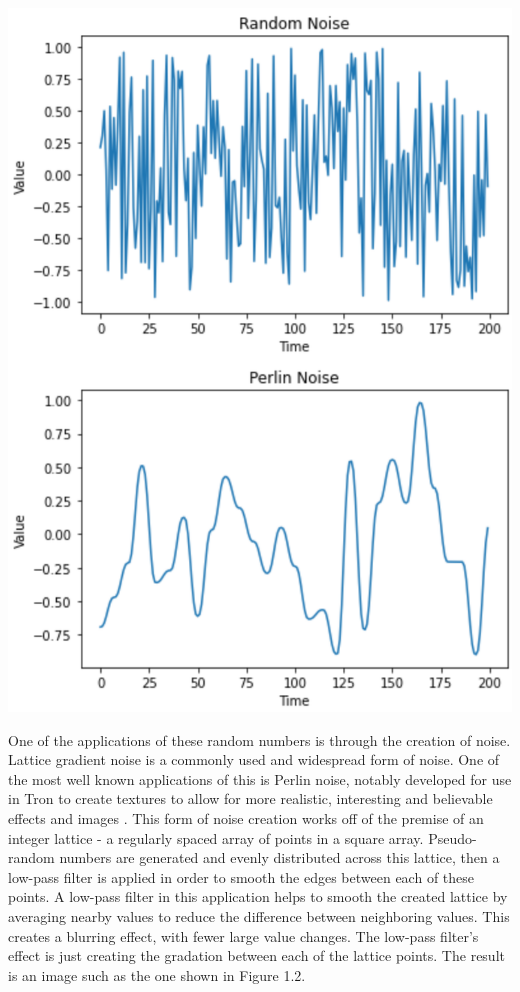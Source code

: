 \documentclass[10pt]{report}
\begin{document}
		\begin{minipage}{\textwidth}
			\centering
			\includegraphics[scale=0.3]{perlinnoise}
			\label{fig:fig15}
		\end{minipage}
		
		One of the applications of these random numbers is through the creation of noise. Lattice gradient noise is a commonly used and widespread form of noise. One of the most well known applications of this is Perlin noise, notably developed for use in Tron to create textures to allow for more realistic, interesting and believable effects and images \cite{ken-perlin}. This form of noise creation works off of the premise of an integer lattice - a regularly spaced array of points in a square array\cite{integer-lattice}. Pseudo-random numbers are generated and evenly distributed across this lattice, then a low-pass filter is applied in order to smooth the edges between each of these points. A low-pass filter in this application helps to smooth the created lattice by averaging nearby values to reduce the difference between neighboring values. This creates a blurring effect, with fewer large value changes. The low-pass filter's effect is just creating the gradation between each of the lattice points. The result is an image such as the one shown in Figure 1.2.
		
\end{document}
